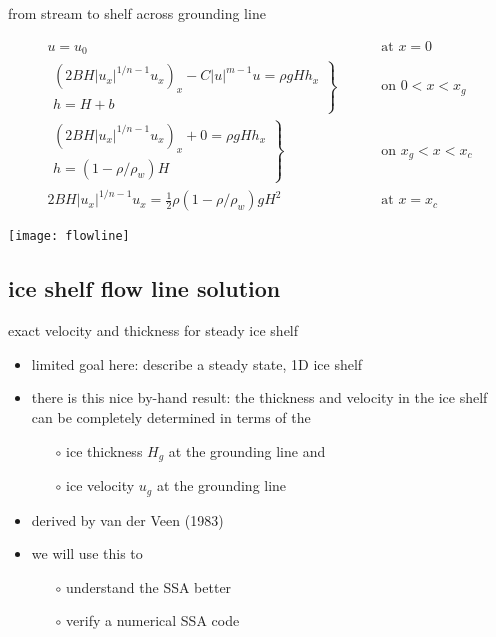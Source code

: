 \begin{frame}{from stream to shelf across grounding line}
\label{slide:streamtoshelf}

\begin{align*}
  u = u_0 & \qquad \text{ at } x = 0 \\
  \left.\begin{array}{r}
  \left(2 B H |u_x|^{1/n - 1} u_x\right)_x - C|u|^{m-1}u = \rho g H h_x \\
  h = H + b
  \end{array}\right\}& \qquad \text{ on } 0 < x < x_g \\
  \left.\begin{array}{r}
  \left(2 B H |u_x|^{1/n - 1} u_x\right)_x + 0 = \rho g H h_x \\
  h = (1-\rho/\rho_w) H
  \end{array}\right\}& \qquad \text{ on } x_g < x < x_c \\
  2 B H |u_x|^{1/n - 1} u_x = \frac{1}{2}\rho (1-\rho/\rho_w) g H^2 & \qquad \text{ at } x = x_c
\end{align*}

\bigskip
\begin{center}
  \texttt{[image: flowline]}
\end{center}
\end{frame}


\subsection{ice shelf flow line solution}

\begin{frame}{exact velocity and thickness for steady ice shelf}

\begin{itemize}
\item limited goal here: describe a steady state, 1D ice shelf
\item there is this nice \alert{by-hand} result: the thickness and velocity in the ice shelf can be completely determined in terms of the 
  \begin{itemize}
  \item[$\circ$] ice thickness $H_g$ at the grounding line and
  \item[$\circ$] ice velocity $u_g$ at the grounding line
  \end{itemize}
\item derived by van der Veen (1983)
\item we will use this to
  \begin{itemize}
  \item[$\circ$] understand the SSA better
  \item[$\circ$] verify a numerical SSA code
  \end{itemize}
\end{itemize}
\end{frame}


